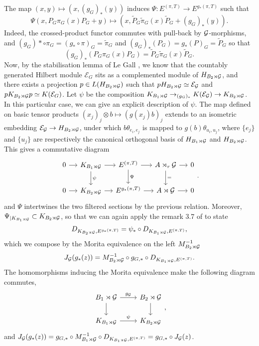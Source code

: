 \begin{dem}
\begin{enumerate}
The map $(x,y)\mapsto (x, (g_G)_*(y))$ induces $\Psi :E^{(\pi,T)}\rightarrow  E^{g_*(\pi,T)} $ such that
\[\Psi(x,P_G \pi_G(x) P_G +y)\mapsto (x,\tilde P_G \tilde\pi_G(x) \tilde P_G+(g_G)_*(y)).\]
Indeed, the crossed-product functor commutes with pull-back by $\mathcal G$-morphisms, and $(g_G)*\circ\pi_G=(g_*\circ\pi)_G=\tilde \pi_G$ and $(g_G)_*(P_G) = g_*(P)_G=\tilde P_G$ so that 
\[(g_G)_*(P_G \pi_G(x) P_G)=\tilde P_G \tilde\pi_G(x) \tilde P_G. \]
Now, by the stabilisation lemma of Le Gall \cite{LeGall}, we know that the countably generated Hilbert module $\mathcal E_G$ sits as a complemented module of $H_{B_2\rtimes\mathcal G}$, and there exists a projection $p\in L(H_{B_2\rtimes\mathcal G})$ such that $pH_{B_2\rtimes\mathcal G}\simeq \mathcal E_\mathcal G$ and $pK_{B_2\rtimes\mathcal G}p\simeq K(\mathcal E_G)$. Let $\psi$ be the composition $K_{B_1\rtimes \mathcal G}\rightarrow_{(g_G)_*} K(\mathcal E_\mathcal G)\rightarrow K_{B_2\rtimes \mathcal G}$. In this particular case, we can give an explicit description of $\psi$. The map defined on basic tensor products $(x_j)_{j}\otimes b\mapsto (g(x_j)b)_j $ extends to an isometric embedding $\mathcal E_\mathcal G \rightarrow H_{B_2\rtimes \mathcal G}$, under which $ b\theta_{e_i,e_j}$ is mapped to $g(b)\theta_{u_i,u_j}$, where $\{e_j\}$ and $\{u_j\}$ are respectively the canonical orthogonal basis of $H_{B_1 \rtimes\mathcal G}$ and $H_{B_2 \rtimes\mathcal G}$. This gives a commutative diagram 
\[\begin{tikzcd}[column sep = small]
0\arrow{r} & K_{B_1\rtimes \G}\arrow{r}\arrow{d}{\psi} & E^{(\pi,T)} \arrow{r}\arrow{d}{\Psi}& A\rtimes_r \G\arrow{r}\arrow{d}{=} & 0\\
0\arrow{r} & K_{B_2\rtimes \G}\arrow{r} & E^{g_*(\pi,T)} \arrow{r}& A\rtimes \G\arrow{r} & 0
\end{tikzcd}.\]
and $\Psi$ intertwines the two filtered sections by the previous relation. Moreover, $\Psi_{|K_{B_1\rtimes \mathcal G}}\subset K_{B_2\rtimes\mathcal G}$, so that we can again apply the remark $3.7$ of \cite{OY2} to state
\[ D_{K_{B_2\rtimes \mathcal G},E^{g_*(\pi,T)}}=\psi_*\circ D_{K_{B_1\rtimes \mathcal G},E^{(\pi,T)}},\]
which we compose by the Morita equivalence on the left $M_{B_2\rtimes\mathcal G}^{-1}$
\[J_\mathcal G(g_*(z)) = M_{B_2\rtimes\mathcal G}^{-1}\circ g_{G,*}\circ D_{K_{B_1\rtimes \mathcal G},E^{(\pi,T)}}.\]
The homomorphisms inducing the Morita equivalence make the following diagram commutes,
\[\begin{tikzcd}B_1\rtimes\G\arrow{r}{g_\G}\arrow{d} & B_2\rtimes \G\arrow{d} \\ K_{B_1\rtimes\G } \arrow{r}{\psi}& K_{B_2\rtimes\G }\end{tikzcd},\]
and $J_\mathcal G(g_*(z))= g_{G,*}\circ M_{B_1\rtimes\mathcal G}^{-1}\circ D_{K_{B_1\rtimes \mathcal G},E^{(\pi,T)}}=g_{G,*}\circ J_\mathcal G(z)$.\\

\end{enumerate}
\end{dem}
